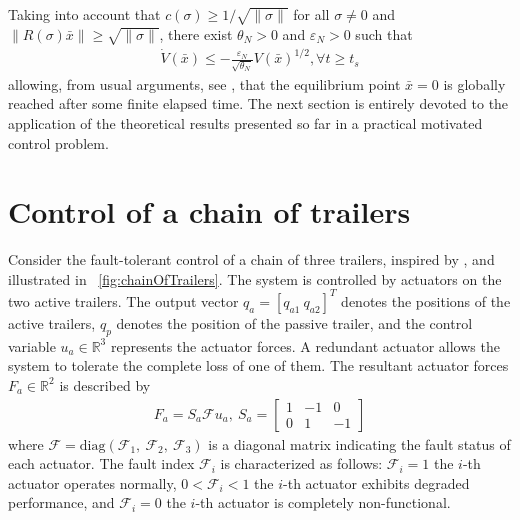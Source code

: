 \documentclass[twocolumn]{autarc_LH}
\begin{document}
Taking into account that $c(\sigma) \geq 1/\sqrt{ \|\sigma \|}$ for all $\sigma \neq 0$ and $\| R(\sigma) \bar x\| \geq \sqrt{\| \sigma \|}$, there exist $\theta_N>0$ and  $\varepsilon_N>0$ such that 
\begin{align} \label{eq_dbarV2}
\dot V( \bar x) \leq  - \frac{\varepsilon_N}{\sqrt{\theta_N}} V(\bar x)^{1/2}, \forall t \geq t_s
\end{align}
allowing, from usual arguments, see \cite{gero:2023}, that the equilibrium point $\bar x = 0$ is globally reached after some finite elapsed time. 
The next section is entirely devoted to the application of the theoretical results presented so far in a practical motivated control problem.

\section{Control of a chain of trailers}
\label{trailer}

Consider the fault-tolerant control of a chain of three trailers, inspired by \cite{HCC:2003}, \cite{CCH:2003} and illustrated in \figurename~\ref{fig:chainOfTrailers}. The system is controlled by actuators on the two active trailers. The output vector $q_a = [ q_{a1}~ q_{a2} ]^T$ denotes the positions of the active trailers, $q_p$ denotes the position of the passive trailer, and the control variable $u_a \in \mathbb{R}^3$ represents the actuator forces. A redundant actuator allows the system to tolerate the complete loss of one of them. The resultant actuator forces $F_a \in \mathbb{R}^2$ is described by
\begin{align*}
F_a = S_a \mathcal{F} u_a,~S_a = \left[ \begin{array}{rrr}
    1 & -1 & 0 \\ 0 &  1 & -1 \end{array} \right]
\end{align*}
where $\mathcal{F} = \text{diag}(\mathcal{F}_1,~\mathcal{F}_2,~\mathcal{F}_3)$ is a diagonal matrix indicating the fault status of each actuator. The fault index $\mathcal{F}_i$ is characterized as follows: $\mathcal{F}_i = 1$ the 
$i$-th actuator operates normally, $ 0 < \mathcal{F}_i < 1 $ the $i$-th actuator exhibits degraded performance, and $\mathcal{F}_i = 0$ the $i$-th actuator is completely non-functional.
\end{document}
